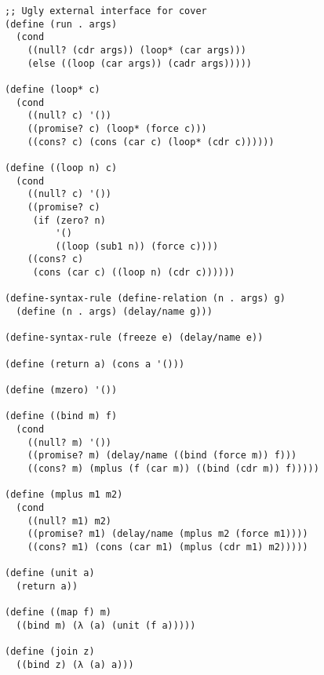 \documentclass[screen,anonymous,review,draft,natbib=false]{acmart} %
\begin{document}
\begin{listing}
\begin{verbatim}
;; Ugly external interface for cover
(define (run . args)
  (cond
    ((null? (cdr args)) (loop* (car args)))
    (else ((loop (car args)) (cadr args)))))

(define (loop* c)
  (cond
    ((null? c) '())
    ((promise? c) (loop* (force c)))
    ((cons? c) (cons (car c) (loop* (cdr c))))))

(define ((loop n) c)
  (cond
    ((null? c) '())
    ((promise? c)
     (if (zero? n)
         '()
         ((loop (sub1 n)) (force c))))
    ((cons? c)
     (cons (car c) ((loop n) (cdr c))))))

(define-syntax-rule (define-relation (n . args) g)
  (define (n . args) (delay/name g)))

(define-syntax-rule (freeze e) (delay/name e))

(define (return a) (cons a '()))

(define (mzero) '())

(define ((bind m) f)
  (cond
    ((null? m) '())
    ((promise? m) (delay/name ((bind (force m)) f)))
    ((cons? m) (mplus (f (car m)) ((bind (cdr m)) f)))))

(define (mplus m1 m2)
  (cond
    ((null? m1) m2)
    ((promise? m1) (delay/name (mplus m2 (force m1))))
    ((cons? m1) (cons (car m1) (mplus (cdr m1) m2)))))

(define (unit a)
  (return a))

(define ((map f) m)
  ((bind m) (λ (a) (unit (f a)))))

(define (join z)
  ((bind z) (λ (a) a)))
\end{verbatim}
\end{listing}
\end{document}
